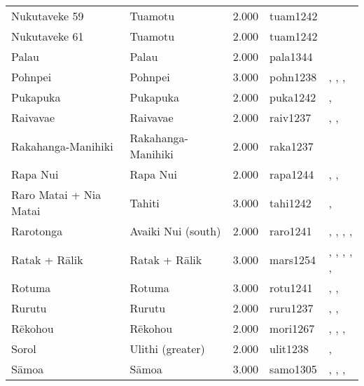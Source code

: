 \begin{longtable}{p{1.8cm}p{1.8cm}p{1.8cm}p{2cm}p{7cm}}
  Nukutaveke 59 & Tuamotu & 2.000 & tuam1242 & \citet{emory1975material} \\ 
  Nukutaveke 61 & Tuamotu & 2.000 & tuam1242 & \citet{emory1975material} \\ 
  Palau & Palau & 2.000 & pala1344 & \citet{force1960leadership} \\ 
  Pohnpei & Pohnpei & 3.000 & pohn1238 & \citet{hanlon2019upon}, \citet{haun1984prehistoric}, \citet{raynor1991indigenous}, \citet{riesenberg1968native} \\ 
  Pukapuka & Pukapuka & 2.000 & puka1242 & \citet{beagleholeandbeaglehole1938}, \citet{macgregor1935} \\ 
  Raivavae & Raivavae & 2.000 & raiv1237 & \citet{aitken1930ethnology}, \citet{bollt2008excavations}, \citet{edwards2003archaeological} \\ 
  Rakahanga-Manihiki & Rakahanga-Manihiki & 2.000 & raka1237 & \citet{buck1932a} \\ 
  Rapa Nui & Rapa Nui & 2.000 & rapa1244 & \citet{sahlins1958social}, \citet{kirch1984evolution}, \citet{metraux_1971} \\ 
  Raro Matai + Nia Matai & Tahiti & 3.000 & tahi1242 & \citet{oliver2019ancient}, \citet{oliver2019ancient} \\ 
  Rarotonga & Avaiki Nui (south) & 2.000 & raro1241 & \citet{bellwood1971varieties}, \citet{buck1934}, \citet{crocombe_1967}, \citet{hayes1981cook}, \citet{walter1996} \\ 
  Ratak + Rālik & Ratak + Rālik & 3.000 & mars1254 & \citet{carruci1991marshall}, \citet{carruci1991marshall}, \citet{erdland1914}, \citet{erdland1914}, \citet{williamson_1982}, \citet{williamson_1982} \\ 
  Rotuma & Rotuma & 3.000 & rotu1241 & \citet{gardiner1898natives}, \citet{howard1963conservatism}, \citet{howard1991} \\ 
  Rurutu & Rurutu & 2.000 & ruru1237 & \citet{aitken1930ethnology}, \citet{bollt2008excavations}, \citet{edwards2003archaeological} \\ 
  Rēkohou & Rēkohou & 2.000 & mori1267 & \citet{sahlins1958social}, \citet{Buck PH (1952) The Coming of the Maori (Whitcombe and Tombs: Wellington, New Zealand).}, \citet{kirch1984evolution}, \citet{van1995maori} \\ 
  Sorol & Ulithi (greater) & 2.000 & ulit1238 & \citet{lessa1950}, \citet{lessa1966} \\ 
  Sāmoa & Sāmoa & 3.000 & samo1305 & \citet{sahlins1958social}, \citet{buck1930}, \citet{keesing1934}, \citet{watters_1958} \\ 

\end{longtable}
